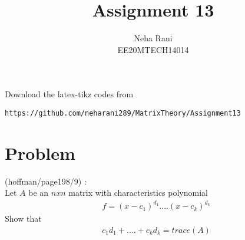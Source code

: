 \documentclass[journal,12pt]{IEEEtran}
\begin{document}
     \def\rightbox#1{\makebox[0in][r]{#1}}
     \def\centbox#1{\makebox[0in]{#1}}
     \def\topbox#1{\raisebox{-\baselineskip}[0in][0in]{#1}}
     \def\midbox#1{\raisebox{-0.5\baselineskip}[0in][0in]{#1}}
\vspace{3cm}
\title{Assignment 13}
\author{Neha Rani\\EE20MTECH14014}
\maketitle
\bigskip
\renewcommand{\thefigure}{\theenumi}
\renewcommand{\thetable}{\theenumi}
%
Download the latex-tikz codes from 
%
\begin{lstlisting}
https://github.com/neharani289/MatrixTheory/Assignment13
\end{lstlisting}
\bigskip
\section{\textbf{Problem}}
(hoffman/page198/9) : \\
%
Let $A$ be an $nxn$ matrix with characteristics polynomial\\
\begin{align}
& f = (x-c_1)^{d_1}....(x-c_k)^{d_k} \nonumber
\end{align}
Show that
\begin{align}
& c_1d_1+....+c_kd_k = trace(A)\nonumber
\end{align}
%
%
%
\bigskip\\
\end{document}
